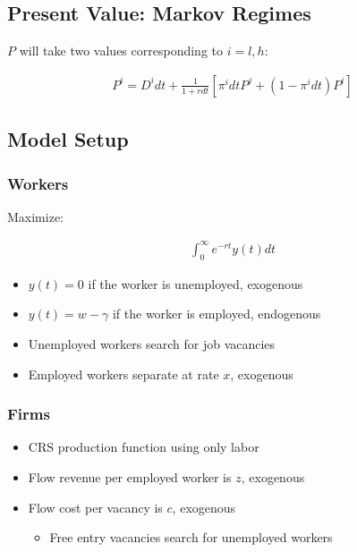 \documentclass[10pt]{article}
\begin{document}
\subsection{Present Value: Markov Regimes}

$P$ will take two values
corresponding to $i = l, h$:

\begin{align}
    P^i=D^i d t+\frac{1}{1+r d t}\left[\pi^i d t P^j+\left(1-\pi^i d t\right) P^i\right]
\end{align}

\subsection{Model Setup}

\subsubsection{Workers}

Maximize:

\begin{align}
    \int_0^{\infty} e^{-r t} y(t) d t
\end{align}

\begin{itemize}
    \item $y(t) = 0$ if the worker is unemployed, exogenous
    \item $y(t) = w - \gamma$ if the worker is employed, endogenous
    \item Unemployed workers search for job vacancies 
    \item Employed workers separate at rate $x$, exogenous
\end{itemize}

\subsubsection{Firms}

\begin{itemize}
    \item CRS production function using only labor 
    \item Flow revenue per employed worker is $z$, exogenous 
    \item Flow cost per vacancy is $c$, exogenous 
        \begin{itemize}
            \item Free entry vacancies search for unemployed workers
        \end{itemize}
\end{itemize}
\end{document}
